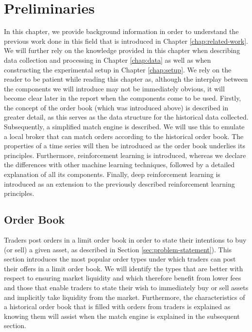\chapter{Preliminaries}
\label{chap:preliminaries}

In this chapter, we provide background information in order to understand the previous work done in this field that is introduced in Chapter \ref{chap:related-work}.
We will further rely on the knowledge provided in this chapter when describing data collection and processing in Chapter \ref{chap:data} as well as when constructing the experimental setup in Chapter \ref{chap:setup}.
We rely on the reader to be patient while reading this chapter as, although the interplay between the components we will introduce may not be immediately obvious, it will become clear later in the report when the components come to be used.
Firstly, the concept of the order book (which was introduced above) is described in greater detail, as this serves as the data structure for the  historical data collected.
Subsequently, a simplified match engine is described. We will use this to emulate a local broker that can match orders according to the historical order book.
The properties of a time series will then be introduced as the order book underlies its principles.
Furthermore, reinforcement learning is introduced, whereas we declare the differences with other machine learning techniques, followed by a detailed explanation of all its components.
Finally, deep reinforcement learning is introduced as an extension to the previously described reinforcement learning principles.

\section{Order Book}

Traders post orders in a limit order book in order to state their intentions to buy (or sell) a given asset, as described in Section \ref{sec:problem-statement}).
This section introduces the most popular order types under which traders can post their offers in a limit order book.
We will identify the types that are better with respect to ensuring market liquidity and which therefore benefit from lower fees and those that enable traders to state their wish to immediately buy or sell assets and implicitly take liquidity from the market.
Furthermore, the characteristics of a historical order book that is filled with orders from traders is explained as knowing them will assist when the match engine is explained in the subsequent section.

